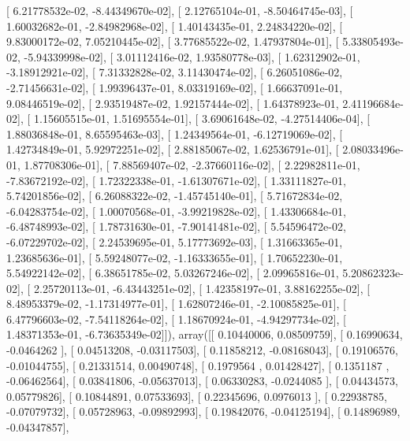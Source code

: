 \documentclass{article}
\begin{document}
       [  6.21778532e-02,  -8.44349670e-02],
       [  2.12765104e-01,  -8.50464745e-03],
       [  1.60032682e-01,  -2.84982968e-02],
       [  1.40143435e-01,   2.24834220e-02],
       [  9.83000172e-02,   7.05210445e-02],
       [  3.77685522e-02,   1.47937804e-01],
       [  5.33805493e-02,  -5.94339998e-02],
       [  3.01112416e-02,   1.93580778e-03],
       [  1.62312902e-01,  -3.18912921e-02],
       [  7.31332828e-02,   3.11430474e-02],
       [  6.26051086e-02,  -2.71456631e-02],
       [  1.99396437e-01,   8.03319169e-02],
       [  1.66637091e-01,   9.08446519e-02],
       [  2.93519487e-02,   1.92157444e-02],
       [  1.64378923e-01,   2.41196684e-02],
       [  1.15605515e-01,   1.51695554e-01],
       [  3.69061648e-02,  -4.27514406e-04],
       [  1.88036848e-01,   8.65595463e-03],
       [  1.24349564e-01,  -6.12719069e-02],
       [  1.42734849e-01,   5.92972251e-02],
       [  2.88185067e-02,   1.62536791e-01],
       [  2.08033496e-01,   1.87708306e-01],
       [  7.88569407e-02,  -2.37660116e-02],
       [  2.22982811e-01,  -7.83672192e-02],
       [  1.72322338e-01,  -1.61307671e-02],
       [  1.33111827e-01,   5.74201856e-02],
       [  6.26088322e-02,  -1.45745140e-01],
       [  5.71672834e-02,  -6.04283754e-02],
       [  1.00070568e-01,  -3.99219828e-02],
       [  1.43306684e-01,  -6.48748993e-02],
       [  1.78731630e-01,  -7.90141481e-02],
       [  5.54596472e-02,  -6.07229702e-02],
       [  2.24539695e-01,   5.17773692e-03],
       [  1.31663365e-01,   1.23685636e-01],
       [  5.59248077e-02,  -1.16333655e-01],
       [  1.70652230e-01,   5.54922142e-02],
       [  6.38651785e-02,   5.03267246e-02],
       [  2.09965816e-01,   5.20862323e-02],
       [  2.25720113e-01,  -6.43443251e-02],
       [  1.42358197e-01,   3.88162255e-02],
       [  8.48953379e-02,  -1.17314977e-01],
       [  1.62807246e-01,  -2.10085825e-01],
       [  6.47796603e-02,  -7.54118264e-02],
       [  1.18670924e-01,  -4.94297734e-02],
       [  1.48371353e-01,  -6.73635349e-02]]), array([[ 0.10440006,  0.08509759],
       [ 0.16990634, -0.0464262 ],
       [ 0.04513208, -0.03117503],
       [ 0.11858212, -0.08168043],
       [ 0.19106576, -0.01044755],
       [ 0.21331514,  0.00490748],
       [ 0.1979564 ,  0.01428427],
       [ 0.1351187 , -0.06462564],
       [ 0.03841806, -0.05637013],
       [ 0.06330283, -0.0244085 ],
       [ 0.04434573,  0.05779826],
       [ 0.10844891,  0.07533693],
       [ 0.22345696,  0.0976013 ],
       [ 0.22938785, -0.07079732],
       [ 0.05728963, -0.09892993],
       [ 0.19842076, -0.04125194],
       [ 0.14896989, -0.04347857],
\end{document}
